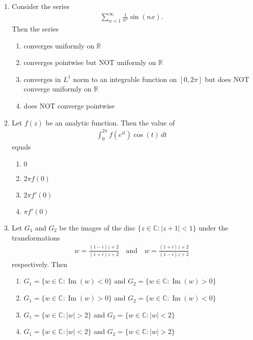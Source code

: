 \documentclass[journal]{IEEEtran}
\numberwithin{equation}{enumi}
\numberwithin{figure}{enumi}
\begin{document}
\begin{enumerate}
\item Consider the series
\begin{align*}
\sum_{n=1}^{\infty} \frac{1}{n^2} \sin(nx).
\end{align*}
Then the series   \hfill{}

\begin{enumerate}
  \item converges uniformly on $\mathbb{R}$
  \item converges pointwise but NOT uniformly on $\mathbb{R}$
  \item converges in $L^1$ norm to an integrable function on $[0, 2\pi]$ but does NOT converge uniformly on $\mathbb{R}$
  \item does NOT converge pointwise
\end{enumerate}



\item Let $f(z)$ be an analytic function. Then the value of  \hfill{}
\begin{align*}
\int_0^{2\pi} f(e^{it}) \cos(t)\,dt
\end{align*}
equals  
\begin{multicols}{4}
\begin{enumerate}
    \item $0$
    \item $2\pi f(0)$
    \item $2\pi f'(0)$
    \item $\pi f'(0)$
\end{enumerate}
\end{multicols}


\item Let $G_1$ and $G_2$ be the images of the disc $\{ z \in \mathbb{C} : |z + 1| < 1 \}$ under the transformations
\begin{align*}
w = \frac{(1 - i)z + 2}{(1 + i)z + 2} \quad \text{and} \quad w = \frac{(1 + i)z + 2}{(1 - i)z + 2}
\end{align*}
respectively. Then     

\begin{enumerate}
   
  \item $G_1 = \{w \in \mathbb{C} : \operatorname{Im}(w) < 0\}$ and $G_2 = \{w \in \mathbb{C} : \operatorname{Im}(w) > 0\}$
  \item $G_1 = \{w \in \mathbb{C} : \operatorname{Im}(w) > 0\}$ and $G_2 = \{w \in \mathbb{C} : \operatorname{Im}(w) < 0\}$
  \item $G_1 = \{w \in \mathbb{C} : |w| > 2\}$ and $G_2 = \{w \in \mathbb{C} : |w| < 2\}$
  \item $G_1 = \{w \in \mathbb{C} : |w| < 2\}$ and $G_2 = \{w \in \mathbb{C} : |w| > 2\}$


\end{enumerate}
\end{enumerate}
\end{document}
